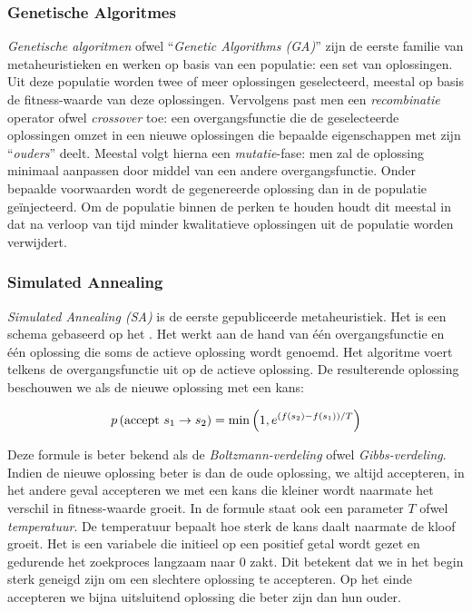 \subsubsection{Genetische Algoritmes}

\emph{Genetische algoritmen} ofwel ``\emph{Genetic Algorithms (GA)}'' zijn de eerste familie van metaheuristieken en werken op basis van een populatie: een set van oplossingen. Uit deze populatie worden twee of meer oplossingen geselecteerd, meestal op basis de fitness-waarde van deze oplossingen. Vervolgens past men een \emph{recombinatie} operator ofwel \emph{crossover} toe: een overgangsfunctie die de geselecteerde oplossingen omzet in een nieuwe oplossingen die bepaalde eigenschappen met zijn ``\emph{ouders}'' deelt. Meestal volgt hierna een \emph{mutatie}-fase: men zal de oplossing minimaal aanpassen door middel van een andere overgangsfunctie. Onder bepaalde voorwaarden wordt de gegenereerde oplossing dan in de populatie ge\"injecteerd. Om de populatie binnen de perken te houden houdt dit meestal in dat na verloop van tijd minder kwalitatieve oplossingen uit de populatie worden verwijdert.\cite{holland1992adaption-in-nat,goldberg89,melanie_mitchell_book}

\subsubsection{Simulated Annealing}

\emph{Simulated Annealing (SA)} is de eerste gepubliceerde metaheuristiek. Het is een schema gebaseerd op het \cite{Metropolis1953}. Het werkt aan de hand van \'e\'en overgangsfunctie en \'e\'en oplossing die soms de actieve oplossing wordt genoemd. Het algoritme voert telkens de overgangsfunctie uit op de actieve oplossing. De resulterende oplossing beschouwen we als de nieuwe oplossing met een kans:

\begin{equation}
p\left(\mbox{accept $s_1\rightarrow s_2$}\right)=\min\left(1,e^{\left(f\left(s_2\right)-f\left(s_1\right)\right)/T}\right)
\end{equation}

Deze formule is beter bekend als de \emph{Boltzmann-verdeling} ofwel \emph{Gibbs-verdeling}\cite{}. Indien de nieuwe oplossing beter is dan de oude oplossing, we altijd accepteren, in het andere geval accepteren we met een kans die kleiner wordt naarmate het verschil in fitness-waarde groeit. In de formule staat ook een parameter $T$ ofwel \emph{temperatuur}. De temperatuur bepaalt hoe sterk de kans daalt naarmate de kloof groeit. Het is een variabele die initieel op een positief getal wordt gezet en gedurende het zoekproces langzaam naar $0$ zakt. Dit betekent dat we in het begin sterk geneigd zijn om een slechtere oplossing te accepteren. Op het einde accepteren we bijna uitsluitend oplossing die beter zijn dan hun ouder.\cite{citeulike:1612433,Cerny1985Thermodynamical}

